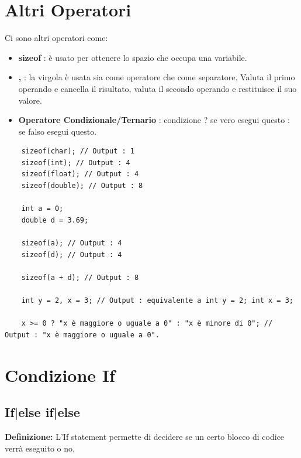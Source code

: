 
\section{Altri Operatori}

\textsf{\small Ci sono altri operatori come: } \\

\begin{itemize}
	\item \textsf{\small \textbf{sizeof} : è usato per ottenere lo spazio che occupa una variabile.}
	\item \textsf{\small \textbf{,} : la virgola è usata sia come operatore che come separatore. Valuta il primo operando e cancella il risultato, valuta il secondo operando e restituisce il suo valore.}
	\item \textsf{\small \textbf{Operatore Condizionale/Ternario} : condizione ? se vero esegui questo : se falso esegui questo.}
\end{itemize}

\begin{lstlisting}
	sizeof(char); // Output : 1
	sizeof(int); // Output : 4
	sizeof(float); // Output : 4
	sizeof(double); // Output : 8
	
	int a = 0;
	double d = 3.69;
	
	sizeof(a); // Output : 4
	sizeof(d); // Output : 4
	
	sizeof(a + d); // Output : 8
	
	int y = 2, x = 3; // Output : equivalente a int y = 2; int x = 3;
	
	x >= 0 ? "x è maggiore o uguale a 0" : "x è minore di 0"; // Output : "x è maggiore o uguale a 0".
\end{lstlisting}


\newpage

\section{Condizione If}

\subsection{If|else if|else}

\textsf{\small \textbf{Definizione:} L'If statement permette di decidere se un certo blocco di codice verrà eseguito o no.} \\

